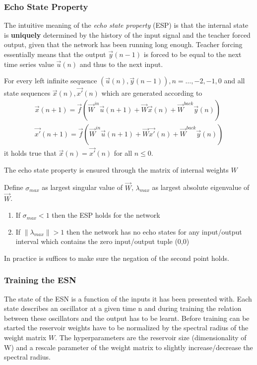 \subsubsection{Echo State Property}
The intuitive meaning of the \emph{echo state property} (ESP) is that the internal state is \textbf{uniquely} determined by the history of the input signal and the teacher forced output, given that the network has been running long enough. Teacher forcing essentially means that the output $\vec{y}(n-1)$ is forced to be equal to the next time series value $\vec{u}(n)$ and thus to the next input.
\begin{frm-def}
For every left infinite sequence $(\vec{u}(n),\vec{y}(n-1)),n=\dots,-2,-1,0$ and all state sequences $\vec{x}(n),\vec{x'}(n)$ which are generated according to
\begin{align*}	
	\vec{x}(n+1)=\vec{f}(\vec{W}^{in}\vec{u}(n+1)+\vec{W}\vec{x}(n)+\vec{W}^{back}\vec{y}(n))\\
	\vec{x'}(n+1)=\vec{f}(\vec{W}^{in}\vec{u}(n+1)+\vec{W}\vec{x'}(n)+\vec{W}^{back}\vec{y}(n))
\end{align*}
it holds true that $\vec{x}(n)=\vec{x'}(n)$ for all $n \leq 0$.
\end{frm-def}
The echo state property is ensured through the matrix of internal weights $W$

\begin{frm-thm}
Define $\sigma_{max}$ as largest singular value of $\vec{W}$, $\lambda_{max}$ as largest absolute eigenvalue of $\vec{W}$.
\begin{enumerate}
\item If $\sigma_{max} < 1$ then the ESP holds for the network
\item If $\|\lambda_{max}\| > 1$ then the network has no echo states for any input/output interval which contains the zero input/output tuple (0,0)
\end{enumerate}
\end{frm-thm}
In practice is suffices to make sure the negation of the second point holds. 

\subsubsection*{Training the ESN}
The state of the ESN is a function of the inputs it has been presented with. Each state describes an oscillator at a given time n and during training the relation between these oscillators and the output has to be learnt. Before training can be started the reservoir weights have to be normalized by the spectral radius of the weight matrix $W$. The hyperparameters are the reservoir size (dimensionality of W) and a rescale parameter of the weight matrix to slightly increase/decrease the spectral radius.

